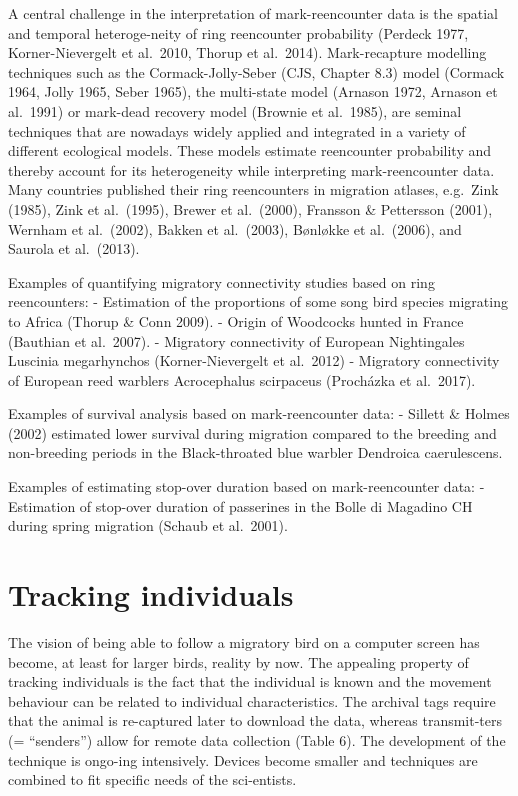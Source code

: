 \documentclass[
]{book}
\begin{document}
A central challenge in the interpretation of mark-reencounter data is the spatial and temporal heteroge-neity of ring reencounter probability (Perdeck 1977, Korner-Nievergelt et al.~2010, Thorup et al.~2014). Mark-recapture modelling techniques such as the Cormack-Jolly-Seber (CJS, Chapter 8.3) model (Cormack 1964, Jolly 1965, Seber 1965), the multi-state model (Arnason 1972, Arnason et al.~1991) or mark-dead recovery model (Brownie et al.~1985), are seminal techniques that are nowadays widely applied and integrated in a variety of different ecological models. These models estimate reencounter probability and thereby account for its heterogeneity while interpreting mark-reencounter data.\\
Many countries published their ring reencounters in migration atlases, e.g.~Zink (1985), Zink et al.~(1995), Brewer et al.~(2000), Fransson \& Pettersson (2001), Wernham et al.~(2002), Bakken et al.~(2003), Bønløkke et al.~(2006), and Saurola et al.~(2013).

Examples of quantifying migratory connectivity studies based on ring reencounters:
- Estimation of the proportions of some song bird species migrating to Africa (Thorup \& Conn 2009).
- Origin of Woodcocks hunted in France (Bauthian et al.~2007).
- Migratory connectivity of European Nightingales Luscinia megarhynchos (Korner-Nievergelt et al.~2012)
- Migratory connectivity of European reed warblers Acrocephalus scirpaceus (Procházka et al.~2017).

Examples of survival analysis based on mark-reencounter data:
- Sillett \& Holmes (2002) estimated lower survival during migration compared to the breeding and non-breeding periods in the Black-throated blue warbler Dendroica caerulescens.

Examples of estimating stop-over duration based on mark-reencounter data:
- Estimation of stop-over duration of passerines in the Bolle di Magadino CH during spring migration (Schaub et al.~2001).

\hypertarget{tracking-individuals}{%
\section{Tracking individuals}\label{tracking-individuals}}

The vision of being able to follow a migratory bird on a computer screen has become, at least for larger birds, reality by now. The appealing property of tracking individuals is the fact that the individual is known and the movement behaviour can be related to individual characteristics.
The archival tags require that the animal is re-captured later to download the data, whereas transmit-ters (= ``senders'') allow for remote data collection (Table 6). The development of the technique is ongo-ing intensively. Devices become smaller and techniques are combined to fit specific needs of the sci-entists.
\end{document}
